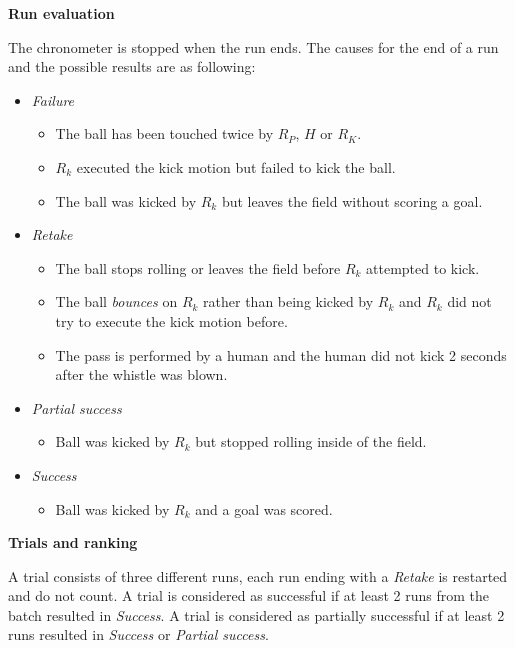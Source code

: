 {\bfseries Run evaluation}

\smallskip

The chronometer is stopped when the run ends. The causes for the end of a run and
the possible results are as following:
\begin{itemize}
\item \textit{Failure}
  \begin{itemize}
    \item The ball has been touched twice by $R_P$, $H$ or $R_K$.
    \item $R_k$ executed the kick motion but failed to kick the ball.
    \item The ball was kicked by $R_k$ but leaves the field without scoring a goal.
  \end{itemize}
\item \textit{Retake}
  \begin{itemize}
    \item The ball stops rolling or leaves the field before $R_k$ attempted to kick.
    \item The ball \emph{bounces} on $R_k$ rather than being kicked by $R_k$ and
          $R_k$ did not try to execute the kick motion before.
    \item The pass is performed by a human and the human did not kick 2 seconds after
          the whistle was blown.
  \end{itemize}
\item \textit{Partial success}
  \begin{itemize}
    \item Ball was kicked by $R_k$ but stopped rolling inside of the field.
  \end{itemize}
\item \textit{Success}
  \begin{itemize}
    \item Ball was kicked by $R_k$ and a goal was scored.
  \end{itemize}
\end{itemize}

{\bfseries Trials and ranking}

A trial consists of three different runs, each run ending with a \textit{Retake}
is restarted and do not count. A trial is considered as successful if at least 2
runs from the batch resulted in \textit{Success}. A trial is considered as
partially successful if at least 2 runs resulted in \textit{Success} or \textit{Partial success}.

